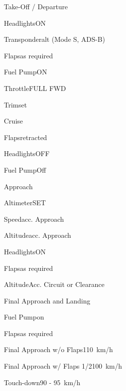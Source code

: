 \begin{checklist}{Take-Off / Departure}
	  \item{Headlights}{ON}
	  \item{Transponder}{alt (Mode S, ADS-B)}
	  \item{Flaps}{as required}
	  \item{Fuel Pump}{ON}
	  \item{Throttle}{FULL FWD}
	\item{Trim}{set}
\end{checklist}
	
\begin{checklist}{Cruise}
	\item{Flaps}{retracted}
	\item{Headlights}{OFF}
	\item{Fuel Pump}{Off} 
	 
\end{checklist}

\begin{checklist}{Approach}
	\item{Altimeter}{SET}
	\item{Speed}{acc. Approach}
	\item{Altitude}{acc. Approach}
	\item{Headlights}{ON}
	\item{Flaps}{as required}
	\item{Altitude}{Acc. Circuit or Clearance}
\end{checklist}

\begin{checklist}{Final Approach and Landing}
	\item{Fuel Pump}{on}
	\item{Flaps}{as required}
	\item{Final Approach w/o Flaps}{110~km/h}
	\item{Final Approach w/ Flaps 1/2}{100~km/h}
	\item{Touch-down}{90 - 95~km/h}
\end{checklist}

